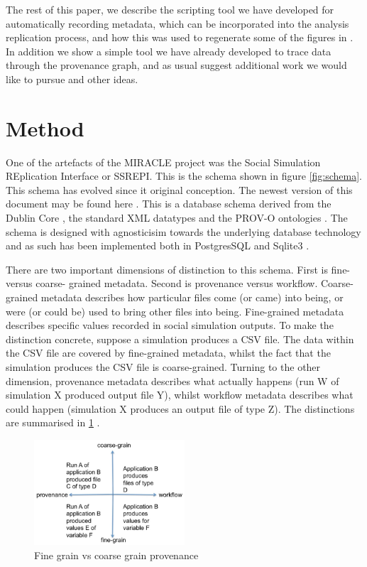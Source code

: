 \documentclass[runningheads]{llncs}
\begin{document}
The rest of this paper, we describe the scripting tool we have developed  for
automatically recording metadata, which can be incorporated into the analysis
replication process, and how this  was used to regenerate some of the figures
in \cite{polhill_nonlinearities_2013}. In addition we show a simple tool we have already developed to trace data through the provenance graph, and as usual suggest additional work we would like to pursue and other ideas.


\section{Method}

One of the artefacts of the MIRACLE project \cite{parker2019final} was the
Social Simulation REplication Interface or SSREPI. This is the schema shown in
figure \ref{fig:schema}.  This schema has evolved since it original conception.
The newest version of this document may be found here
\cite{polhill2022miracle}. This is a database schema derived from the Dublin
Core \cite{weibel2000dublin}, the standard XML datatypes \cite{biron2004xml}
and the PROV-O ontologies \cite{missier2013w3c}.  The schema is designed with
agnosticisim towards the underlying database technology and as such has been
implemented both in PostgresSQL \cite{stonebraker1991postgres} and Sqlite3
\cite{sqliteorg2023syntax}.

There are two important dimensions of distinction to this schema. First is
fine- versus coarse- grained metadata. Second is provenance versus workflow.
Coarse-grained metadata describes how particular files come (or came) into
being, or were (or could be) used to bring other files into being. Fine-grained
metadata describes specific values recorded in social simulation outputs. To
make the distinction concrete, suppose a simulation produces a CSV file. The
data within the CSV file are covered by fine-grained metadata, whilst the fact
that the simulation produces the CSV file is coarse-grained. Turning to the
other dimension, provenance metadata describes what actually happens (run W of
simulation X produced output file Y), whilst workflow metadata describes what
could happen (simulation X produces an output file of type Z). The distinctions
are summarised in \ref{fig:finegrain} .

\begin{figure}
\includegraphics[width=0.5\textwidth]{img/fine-grain-vs-coarse-grain.jpeg}
\caption{Fine grain vs coarse grain provenance} \label{fig:finegrain}
\end{figure}
\end{document}
